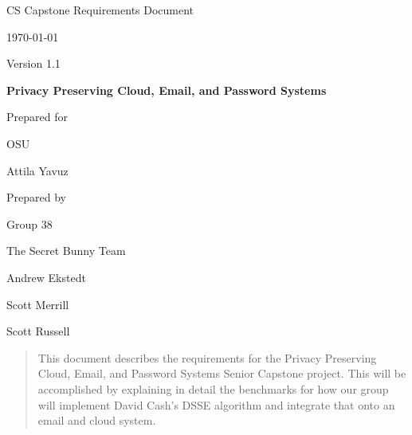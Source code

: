 \documentclass[onecolumn, draftclsnofoot,10pt, compsoc]{IEEEtran}
\def \CapstoneTeamName{		The Secret Bunny Team}
\def \CapstoneTeamNumber{		38}
\def \GroupMemberOne{			Andrew Ekstedt}
\def \GroupMemberTwo{			Scott Merrill}
\def \GroupMemberThree{			Scott Russell}
\def \CapstoneProjectName{		Privacy Preserving Cloud, Email, and Password Systems}
\def \CapstoneSponsorCompany{	OSU}
\def \CapstoneSponsorPerson{		Attila Yavuz}
\def \DocType{	%
				Requirements Document
				}
\newcommand{\NameSigPair}[1]{\par
\makebox[2.75in][r]{#1} \hfil 	\makebox[3.25in]{\makebox[2.25in]{\hrulefill} \hfill		\makebox[.75in]{\hrulefill}}
\par\vspace{-12pt} \textit{\tiny\noindent
\makebox[2.75in]{} \hfil		\makebox[3.25in]{\makebox[2.25in][r]{Signature} \hfill	\makebox[.75in][r]{Date}}}}
\renewcommand{\NameSigPair}[1]{#1}
\begin{document}
\begin{titlepage}
    \begin{singlespace}
        \hfill 
        \par\vspace{.2in}
        \centering
        \scshape{
            \huge CS Capstone \DocType \par
            {\large\today\par Version 1.1}\par
            \vspace{.5in}
            \textbf{\Huge\CapstoneProjectName}\par
            \vfill
            {\large Prepared for}\par
            \Huge \CapstoneSponsorCompany\par
            \vspace{5pt}
            {\Large\NameSigPair{\CapstoneSponsorPerson}\par}
            {\large Prepared by }\par
            Group\CapstoneTeamNumber\par
            \CapstoneTeamName\par 
            \vspace{5pt}
            {\Large
                \NameSigPair{\GroupMemberOne}\par
                \NameSigPair{\GroupMemberTwo}\par
                \NameSigPair{\GroupMemberThree}\par
            }
            \vspace{20pt}
        }
        \begin{abstract}
        	
            This document describes the requirements for the Privacy Preserving Cloud, Email, and Password Systems Senior Capstone project.  This will be accomplished by explaining in detail the benchmarks for how our group will implement David Cash's DSSE algorithm and integrate that onto an email and cloud system.
            
            
        \end{abstract}    
        
        
    \end{singlespace}
\end{titlepage}
\newpage
{}
\tableofcontents
\clearpage
\end{document}
